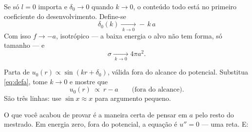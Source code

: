 \documentclass[11pt,a4paper]{article}
\begin{document}
Se só $l=0$ importa e $\delta_{0}\to0$ quando $k\to0$, o conteúdo todo está no
primeiro coeficiente do desenvolvimento. Define-se
\begin{equation}
\boxed{\;\delta_{0}(k) \xrightarrow[\;k\to0\;]{} -\,k\,a\;}
\label{eq:defa}
\end{equation}
Com isso $f\to -a$, isotrópico — a baixa energia o alvo não tem forma, só tamanho — e
\begin{equation}
\sigma \xrightarrow[\;k\to0\;]{} 4\pi a^{2}.
\end{equation}

\begin{suavez}
Parta de $u_{0}(r)\propto\sin(kr+\delta_{0})$, válida fora do alcance do potencial.
Substitua \eqref{eq:defa}, tome $k\to0$ e mostre que
\[
u_{0}(r)\ \propto\ r-a
\qquad\text{(fora do alcance).}
\]
São três linhas: use $\sin x\approx x$ para argumento pequeno.

\vspace{2.0cm}
\hrulefill
\end{suavez}

O que você acabou de provar é a maneira certa de pensar em $a$ pelo resto do
mestrado. Em energia zero, fora do potencial, a equação é $u''=0$ — uma reta. E:

\begin{center}
\end{center}
\end{document}
